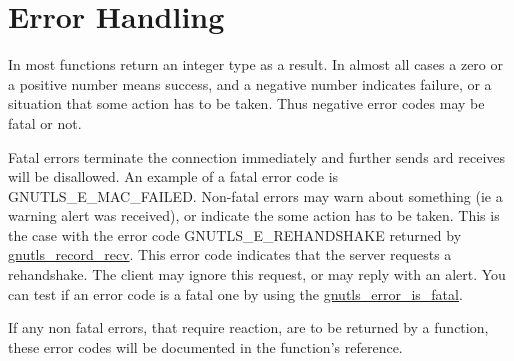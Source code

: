 \section{Error Handling}
\par
In \gnutls{} most functions return an integer type as a result.
In almost all cases a zero or a positive number means success, and
a negative number indicates failure, or a situation that some
action has to be taken. Thus negative error codes may be fatal
or not. 
\par 
Fatal errors terminate the connection immediately and
further sends ard receives will be disallowed. An example of
a fatal error code is GNUTLS\_E\_MAC\_FAILED. Non-fatal errors
may warn about something (ie a warning alert was received), or
indicate the some action has to be taken. This is the case with
the error code GNUTLS\_E\_REHANDSHAKE returned by 
\hyperref{gnutls\_record\_recv()}{gnutls\_record\_recv() (see Section }{)}{gnutls_record_recv}.
This error code indicates that the server requests a rehandshake. The client
may ignore this request, or may reply with an alert.
You can test if an error code is a fatal one by using the
\hyperref{gnutls\_error\_is\_fatal()}{gnutls\_error\_is\_fatal() (see Section }{)}{gnutls_error_is_fatal}.
\par
If any non fatal errors, that require reaction, are to be returned by a
function, these error codes will be documented
in the function's reference.

